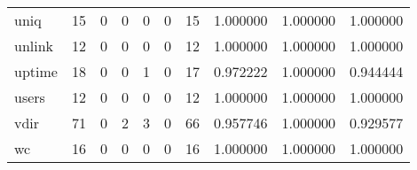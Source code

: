 \begin{longtable}{lrrrrrrrrr}
uniq      &                                      15 &                                                  0 &                                                  0 &                                                  0 &                                                  0 &                                                 15 &                                           1.000000 &                               1.000000 &                             1.000000 \\
unlink    &                                      12 &                                                  0 &                                                  0 &                                                  0 &                                                  0 &                                                 12 &                                           1.000000 &                               1.000000 &                             1.000000 \\
uptime    &                                      18 &                                                  0 &                                                  0 &                                                  1 &                                                  0 &                                                 17 &                                           0.972222 &                               1.000000 &                             0.944444 \\
users     &                                      12 &                                                  0 &                                                  0 &                                                  0 &                                                  0 &                                                 12 &                                           1.000000 &                               1.000000 &                             1.000000 \\
vdir      &                                      71 &                                                  0 &                                                  2 &                                                  3 &                                                  0 &                                                 66 &                                           0.957746 &                               1.000000 &                             0.929577 \\
wc        &                                      16 &                                                  0 &                                                  0 &                                                  0 &                                                  0 &                                                 16 &                                           1.000000 &                               1.000000 &                             1.000000 \\

\end{longtable}
